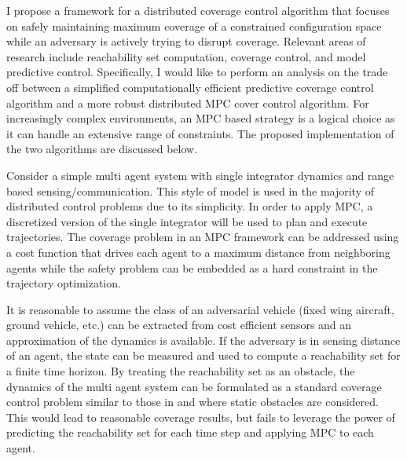 \documentclass{article}
\begin{document}
I propose a framework for a distributed coverage control algorithm that focuses on safely maintaining maximum coverage of a constrained configuration space while an adversary is actively trying to disrupt coverage. Relevant areas of research include reachability set computation, coverage control, and model predictive control. Specifically, I would like to perform an analysis on the trade off between a simplified computationally efficient predictive coverage control algorithm and a more robust distributed MPC cover control algorithm. For increasingly complex environments, an MPC based strategy is a logical choice as it can handle an extensive range of constraints. The proposed implementation of the two algorithms are discussed below.

Consider a simple multi agent system with single integrator dynamics and range based sensing/communication. This style of model is used in the majority of distributed control problems due to its simplicity. In order to apply MPC, a discretized version of the single integrator will be used to plan and execute trajectories. The coverage problem in an MPC framework can be addressed using a cost function that drives each agent to a maximum distance from neighboring agents while the safety problem can be embedded as a hard constraint in the trajectory optimization. 

It is reasonable to assume the class of an adversarial vehicle (fixed wing aircraft, ground vehicle, etc.) can be extracted from cost efficient sensors and an approximation of the dynamics is available. If the adversary is in sensing distance of an agent, the state can be measured and used to compute a reachability set for a finite time horizon. By treating the reachability set as an obstacle, the dynamics of the multi agent system can be formulated as a standard coverage control problem similar to those in \cite{rout} and \cite{zhong} where static obstacles are considered. This would lead to reasonable coverage results, but fails to leverage the power of predicting the reachability set for each time step and applying MPC to each agent. 
\end{document}

